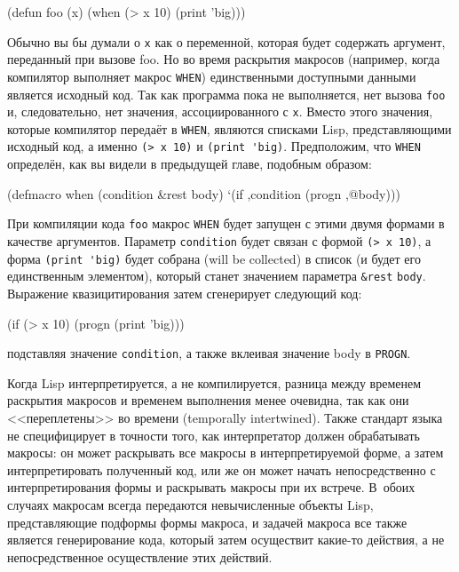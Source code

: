 \begin{myverb}
(defun foo (x)
  (when (> x 10) (print 'big)))
\end{myverb}

Обычно вы бы думали о \lstinline{x} как о переменной, которая будет содержать аргумент,
переданный при вызове foo. Но во время раскрытия макросов (например, когда компилятор
выполняет макрос \lstinline{WHEN}) единственными доступными данными является исходный
код. Так как программа пока не выполняется, нет вызова \lstinline{foo} и, следовательно, нет
значения, ассоциированного с \lstinline{x}. Вместо этого значения, которые компилятор передаёт
в \lstinline{WHEN}, являются списками Lisp, представляющими исходный код, а именно 
\lstinline{(> x 10)} и \lstinline{(print 'big)}. Предположим, что \lstinline{WHEN} определён, как вы видели в
предыдущей главе, подобным образом:

\begin{myverb}
(defmacro when (condition &rest body)
  `(if ,condition (progn ,@body)))
\end{myverb}

При компиляции кода \lstinline{foo} макрос \lstinline{WHEN} будет запущен с этими двумя формами в
качестве аргументов. Параметр \lstinline{condition} будет связан с формой \lstinline{(> x 10)}, а
форма \lstinline{(print 'big)} будет собрана (will be collected) в список (и будет его
единственным элементом), который станет значением параметра \lstinline!&rest!
\lstinline{body}. Выражение квазицитирования затем сгенерирует следующий код:

\begin{myverb}
(if (> x 10) (progn (print 'big)))
\end{myverb}

\noindent{}подставляя значение \lstinline{condition}, а также вклеивая значение body в \lstinline{PROGN}.

Когда Lisp интерпретируется, а не компилируется, разница между временем раскрытия макросов
и временем выполнения менее очевидна, так как они <<переплетены>> во времени (temporally
intertwined). Также стандарт языка не специфицирует в точности того, как интерпретатор должен
обрабатывать макросы: он может раскрывать все макросы в интерпретируемой форме, а затем
интерпретировать полученный код, или же он может начать непосредственно с интерпретирования
формы и раскрывать макросы при их встрече. В~обоих случаях макросам всегда передаются
невычисленные объекты Lisp, представляющие подформы формы макроса, и задачей макроса все
также является генерирование кода, который затем осуществит какие-то действия, а не
непосредственное осуществление этих действий.

